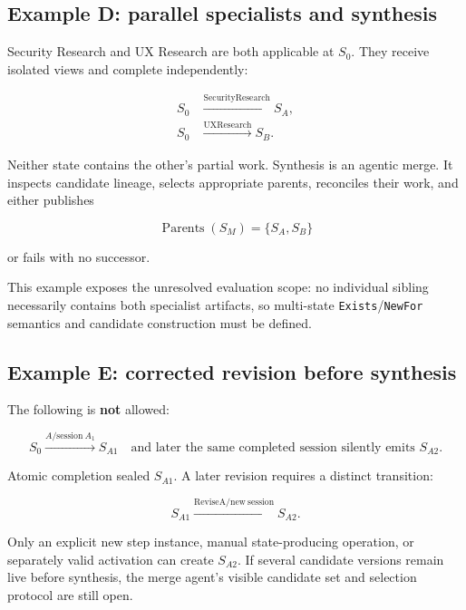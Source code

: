\documentclass[11pt]{article}
\newcommand{\artifact}[1]{\texttt{#1}}
\begin{document}
\subsection{Example D: parallel specialists and synthesis}

Security Research and UX Research are both applicable at \(S_0\). They receive isolated views and complete independently:

\begin{align}
 S_0 &\xrightarrow{\mathrm{SecurityResearch}} S_A,\\
 S_0 &\xrightarrow{\mathrm{UXResearch}} S_B.
\end{align}

Neither state contains the other's partial work. Synthesis is an agentic merge. It inspects candidate lineage, selects appropriate parents, reconciles their work, and either publishes

\begin{equation}
 \operatorname{Parents}(S_M)=\{S_A,S_B\}
\end{equation}

or fails with no successor.

This example exposes the unresolved evaluation scope: no individual sibling necessarily contains both specialist artifacts, so multi-state \artifact{Exists}/\artifact{NewFor} semantics and candidate construction must be defined.

\subsection{Example E: corrected revision before synthesis}

The following is \textbf{not} allowed:

\begin{equation}
 S_0 \xrightarrow{A/\mathrm{session}\ A_1} S_{A1}
 \quad\text{and later the same completed session silently emits }S_{A2}.
\end{equation}

Atomic completion sealed \(S_{A1}\). A later revision requires a distinct transition:

\begin{equation}
 S_{A1}\xrightarrow{\mathrm{ReviseA}/\mathrm{new\ session}}S_{A2}.
\end{equation}

Only an explicit new step instance, manual state-producing operation, or separately valid activation can create \(S_{A2}\). If several candidate versions remain live before synthesis, the merge agent's visible candidate set and selection protocol are still open.
\end{document}
